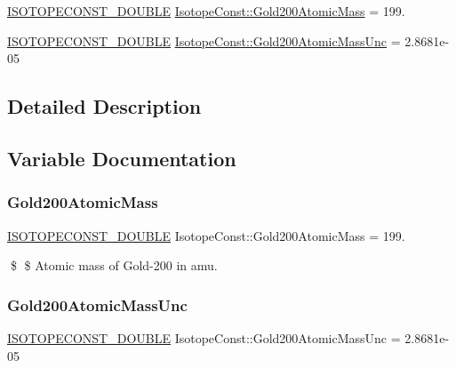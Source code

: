 \begin{DoxyCompactItemize}
\item 
\mbox{\hyperlink{group___isotope_const-_macros_ga8f45a7272ce02c0b4c65c44636ed719a}{I\+S\+O\+T\+O\+P\+E\+C\+O\+N\+S\+T\+\_\+\+D\+O\+U\+B\+LE}} \mbox{\hyperlink{group___isotope_const-_gold-_au200_ga76e5b1fa27f6c19701ae5fb8f3103a4e}{Isotope\+Const\+::\+Gold200\+Atomic\+Mass}} = 199.
\item 
\mbox{\hyperlink{group___isotope_const-_macros_ga8f45a7272ce02c0b4c65c44636ed719a}{I\+S\+O\+T\+O\+P\+E\+C\+O\+N\+S\+T\+\_\+\+D\+O\+U\+B\+LE}} \mbox{\hyperlink{group___isotope_const-_gold-_au200_ga1c2c6f37e4e7aa709e719bcaa29c61d0}{Isotope\+Const\+::\+Gold200\+Atomic\+Mass\+Unc}} = 2.\+8681e-\/05
\end{DoxyCompactItemize}


\subsection{Detailed Description}


\subsection{Variable Documentation}
\mbox{\label{group___isotope_const-_gold-_au200_ga76e5b1fa27f6c19701ae5fb8f3103a4e}} 
\subsubsection{\texorpdfstring{Gold200\+Atomic\+Mass}{Gold200AtomicMass}}
{\footnotesize\ttfamily \mbox{\hyperlink{group___isotope_const-_macros_ga8f45a7272ce02c0b4c65c44636ed719a}{I\+S\+O\+T\+O\+P\+E\+C\+O\+N\+S\+T\+\_\+\+D\+O\+U\+B\+LE}} Isotope\+Const\+::\+Gold200\+Atomic\+Mass = 199.}

\$ \$ Atomic mass of Gold-\/200 in amu. \mbox{\label{group___isotope_const-_gold-_au200_ga1c2c6f37e4e7aa709e719bcaa29c61d0}} 
\subsubsection{\texorpdfstring{Gold200\+Atomic\+Mass\+Unc}{Gold200AtomicMassUnc}}
{\footnotesize\ttfamily \mbox{\hyperlink{group___isotope_const-_macros_ga8f45a7272ce02c0b4c65c44636ed719a}{I\+S\+O\+T\+O\+P\+E\+C\+O\+N\+S\+T\+\_\+\+D\+O\+U\+B\+LE}} Isotope\+Const\+::\+Gold200\+Atomic\+Mass\+Unc = 2.\+8681e-\/05}

